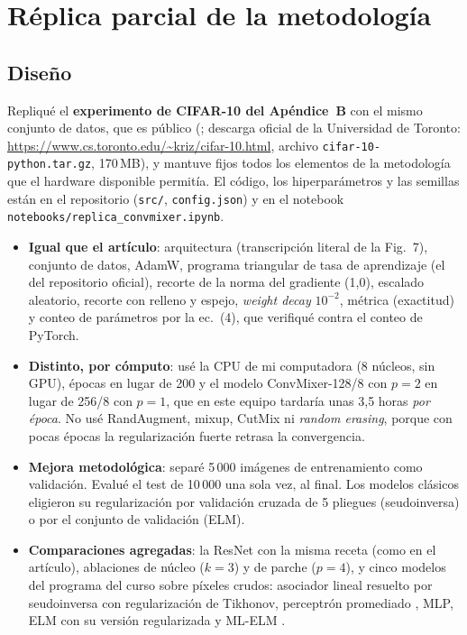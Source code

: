 \documentclass[11pt,a4paper]{article}
\begin{document}
\section{Réplica parcial de la metodología}
\subsection{Diseño}
Repliqué el \textbf{experimento de CIFAR-10 del Apéndice~B} con el mismo conjunto de datos, que es público (\citealp{cifar}; descarga oficial de la Universidad de Toronto: \url{https://www.cs.toronto.edu/~kriz/cifar-10.html}, archivo \texttt{cifar-10-python.tar.gz}, 170\,MB), y
mantuve fijos todos los elementos de la metodología que el hardware disponible permitía. El código, los
hiperparámetros y las semillas están en el repositorio (\texttt{src/}, \texttt{config.json}) y en el notebook
\texttt{notebooks/replica\_convmixer.ipynb}.
\begin{itemize}
  \item \textbf{Igual que el artículo}: arquitectura (transcripción literal de la Fig.~7), conjunto de datos,
  AdamW, programa triangular de tasa de aprendizaje (el del repositorio oficial), recorte de la norma del gradiente
  (1,0), escalado aleatorio, recorte con relleno y espejo, \emph{weight decay} $10^{-2}$, métrica (exactitud) y
  conteo de parámetros por la ec.~(4), que verifiqué contra el conteo de PyTorch.
  \item \textbf{Distinto, por cómputo}: usé la CPU de mi computadora (8 núcleos, sin GPU), \epocasCNN{} épocas en lugar de 200 y el
  modelo ConvMixer-128/8 con $p=2$ en lugar de 256/8 con $p=1$, que en este equipo tardaría unas 3,5 horas
  \emph{por época}. No usé RandAugment, mixup, CutMix ni \emph{random erasing}, porque con pocas épocas la
  regularización fuerte retrasa la convergencia.
  \item \textbf{Mejora metodológica}: separé 5\,000 imágenes de entrenamiento como validación. Evalué el test de
  10\,000 una sola vez, al final. Los modelos clásicos eligieron su regularización por validación cruzada
  de 5 pliegues (seudoinversa) o por el conjunto de validación (ELM).
  \item \textbf{Comparaciones agregadas}: la ResNet con la misma receta (como en el artículo), ablaciones de
  núcleo ($k=3$) y de parche ($p=4$), y cinco modelos del programa del curso sobre píxeles crudos: asociador lineal resuelto por seudoinversa con regularización de Tikhonov, perceptrón promediado \citep{freund}, MLP, ELM \citep{elm} con su versión regularizada \citep{elmreg} y ML-ELM \citep{mlelm}.
\end{itemize}
\end{document}
